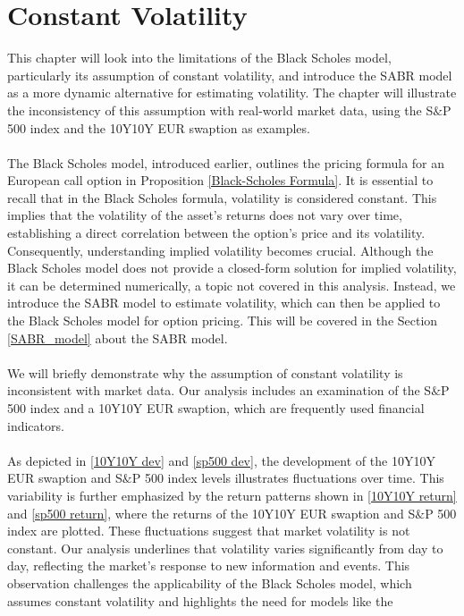 \section{Constant Volatility}
This chapter will look into the limitations 
of the Black Scholes model, particularly its 
assumption of constant volatility, and introduce 
the SABR model as a more dynamic alternative for estimating volatility. 
The chapter will illustrate the inconsistency of 
this assumption with real-world market data, 
using the S$\&$P 500 index and the 10Y10Y EUR swaption 
as examples.
\\\\
The Black Scholes model, introduced earlier, outlines the pricing formula for an European call option in 
Proposition \autoref{Black-Scholes Formula}. It is  essential to recall that in the Black Scholes formula, 
volatility is considered constant. This implies that the volatility of the asset's returns does not vary over time,
establishing a direct correlation between the option's price and its volatility. Consequently, 
understanding implied volatility becomes crucial. Although the Black Scholes model does not provide 
a closed-form solution for implied volatility, it can be determined numerically, a topic not covered 
in this analysis. Instead, we introduce the SABR model to estimate volatility, which can then be 
applied to the Black Scholes model for option pricing. This will be covered in the Section \ref{SABR_model} about the 
SABR model. 
\\\\
We will briefly demonstrate why the assumption of constant volatility is inconsistent with market data. 
Our analysis includes an examination of the S$\&$P 500 index and a 10Y10Y EUR swaption, which are frequently used 
financial indicators. 
\\\\
As depicted in \autoref{10Y10Y dev} and \autoref{sp500 dev}, the development of the 10Y10Y EUR swaption 
and S$\&$P 500 index levels illustrates fluctuations over time. This variability is further emphasized by the return patterns 
shown in \autoref{10Y10Y return} and \autoref{sp500 return}, where the returns of the 10Y10Y EUR swaption and S$\&$P 500 index are plotted. 
These fluctuations suggest that market volatility is not constant. Our analysis underlines that volatility varies 
significantly from day to day, reflecting the market's response to new information and events. This observation challenges 
the applicability of the Black Scholes model, which assumes constant volatility and highlights the need for models like the 
